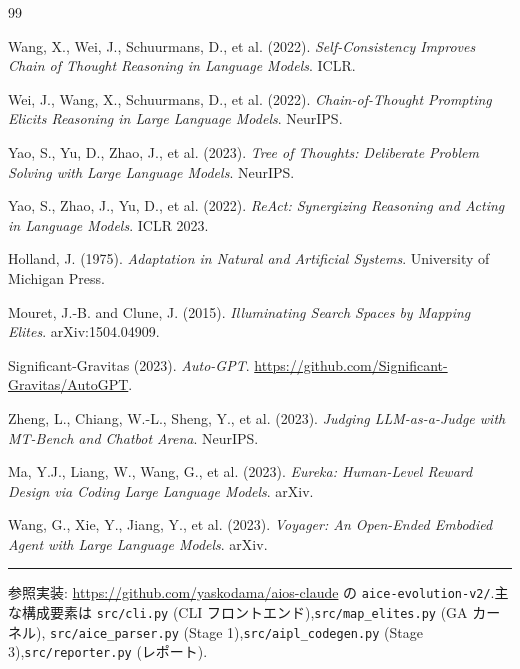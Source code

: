 \documentclass[11pt,a4paper]{article}
\newcommand{\code}[1]{\texttt{\small #1}}
\begin{document}
\begin{thebibliography}{99}
\small

Wang, X., Wei, J., Schuurmans, D., et al. (2022).
\emph{Self-Consistency Improves Chain of Thought Reasoning in Language Models}. ICLR.

Wei, J., Wang, X., Schuurmans, D., et al. (2022).
\emph{Chain-of-Thought Prompting Elicits Reasoning in Large Language Models}. NeurIPS.

Yao, S., Yu, D., Zhao, J., et al. (2023).
\emph{Tree of Thoughts: Deliberate Problem Solving with Large Language Models}. NeurIPS.

Yao, S., Zhao, J., Yu, D., et al. (2022).
\emph{ReAct: Synergizing Reasoning and Acting in Language Models}. ICLR 2023.

Holland, J. (1975). \emph{Adaptation in Natural and Artificial Systems}.
University of Michigan Press.

Mouret, J.-B. and Clune, J. (2015).
\emph{Illuminating Search Spaces by Mapping Elites}. arXiv:1504.04909.

Significant-Gravitas (2023). \emph{Auto-GPT}.
\url{https://github.com/Significant-Gravitas/AutoGPT}.

Zheng, L., Chiang, W.-L., Sheng, Y., et al. (2023).
\emph{Judging LLM-as-a-Judge with MT-Bench and Chatbot Arena}. NeurIPS.

Ma, Y.J., Liang, W., Wang, G., et al. (2023). \emph{Eureka:
Human-Level Reward Design via Coding Large Language Models}. arXiv.

Wang, G., Xie, Y., Jiang, Y., et al. (2023). \emph{Voyager: An
Open-Ended Embodied Agent with Large Language Models}. arXiv.

\end{thebibliography}

\bigskip
\hrule
\smallskip
\noindent\small
参照実装: \url{https://github.com/yaskodama/aios-claude} の
\code{aice-evolution-v2/}.主な構成要素は \code{src/cli.py}
(CLI フロントエンド),\code{src/map\_elites.py} (GA カーネル),
\code{src/aice\_parser.py} (Stage 1),\code{src/aipl\_codegen.py}
(Stage 3),\code{src/reporter.py} (レポート).
\end{document}
